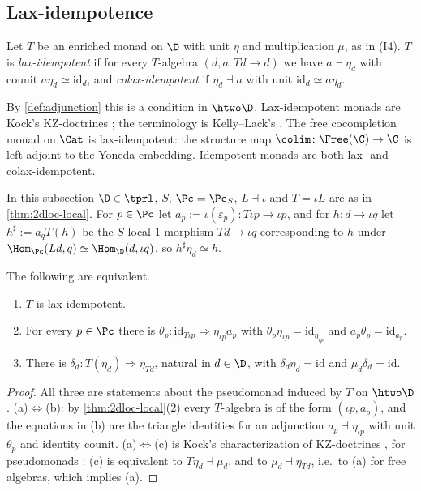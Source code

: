 \subsection{Lax-idempotence}
\label{subsec:2dloc-kz}

\begin{defi}
\label{def:lax-idempotent}
Let $T$ be an enriched monad on $\D$ with unit $\eta$ and multiplication $\mu$, as in (I4).
$T$ is \emph{lax-idempotent} if for every $T$-algebra $(d,a\colon Td \to d)$ we have $a \dashv \eta_{d}$ with counit $a\eta_{d} \simeq \mathrm{id}_{d}$, and \emph{colax-idempotent} if $\eta_{d} \dashv a$ with unit $\mathrm{id}_{d} \simeq a\eta_{d}$.
\end{defi}

By \cref{def:adjunction} this is a condition in $\htwo\D$.
Lax-idempotent monads are Kock's KZ-doctrines \cite{kock1995monads}; the terminology is Kelly--Lack's \cite{kellylack1997propertylike}. The free cocompletion monad on $\Cat$ is lax-idempotent: the structure map $\colim\colon \Free(\C) \to \C$ is left adjoint to the Yoneda embedding. Idempotent monads are both lax- and colax-idempotent.

In this subsection $\D \in \tprl$, $S$, $\Pc = \Pc_{S}$, $L \dashv \iota$ and $T = \iota L$ are as in \cref{thm:2dloc-local}. For $p \in \Pc$ let $a_{p} := \iota(\varepsilon_{p})\colon T\iota p \to \iota p$, and for $h\colon d \to \iota q$ let $h^{\sharp} := a_{q}T(h)$ be the $S$-local $1$-morphism $Td \to \iota q$ corresponding to $h$ under $\Hom_{\Pc}(Ld,q) \simeq \Hom_{\D}(d,\iota q)$, so $h^{\sharp}\eta_{d} \simeq h$.

\begin{lem}
\label{lem:kz-criteria}
The following are equivalent.
\begin{enumerate}
\item[(a)] $T$ is lax-idempotent.
\item[(b)] For every $p \in \Pc$ there is $\theta_{p}\colon \mathrm{id}_{T\iota p} \Rightarrow \eta_{\iota p}a_{p}$ with $\theta_{p}\eta_{\iota p} = \mathrm{id}_{\eta_{\iota p}}$ and $a_{p}\theta_{p} = \mathrm{id}_{a_{p}}$.
\item[(c)] There is $\delta_{d}\colon T(\eta_{d}) \Rightarrow \eta_{Td}$, natural in $d \in \D$, with $\delta_{d}\eta_{d} = \mathrm{id}$ and $\mu_{d}\delta_{d} = \mathrm{id}$.
\end{enumerate}
\end{lem}

\begin{proof}
All three are statements about the pseudomonad induced by $T$ on $\htwo\D$.
(a)$\Leftrightarrow$(b): by \cref{thm:2dloc-local}(2) every $T$-algebra is of the form $(\iota p,a_{p})$, and the equations in (b) are the triangle identities for an adjunction $a_{p} \dashv \eta_{\iota p}$ with unit $\theta_{p}$ and identity counit.
(a)$\Leftrightarrow$(c) is Kock's characterization of KZ-doctrines \cite{kock1995monads}, for pseudomonads \cite{marmolejo1997doctrines}: (c) is equivalent to $T\eta_{d} \dashv \mu_{d}$, and to $\mu_{d} \dashv \eta_{Td}$, i.e.\ to (a) for free algebras, which implies (a).
\end{proof}

